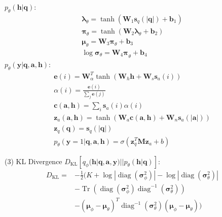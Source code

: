 \documentclass{article}
\newcommand{\nobracket}{}
\newcommand{\tmmathbf}[1]{\ensuremath{\boldsymbol{#1}}}
\newcommand{\tmop}[1]{\ensuremath{\operatorname{#1}}}
\begin{document}
\begin{appendices}
$p_{\theta} ( \tmmathbf{h} | \tmmathbf{q} \nobracket)$:
\begin{eqnarray}
  & \tmmathbf{\lambda}_{\theta} = \tanh ( \tmmathbf{W}_1 \tmmathbf{s}_q ( |
  \tmmathbf{q} |) +\tmmathbf{b}_1)  &   \\
  & \tmmathbf{\pi}_{\theta} = \tanh ( \tmmathbf{W}_2
  \tmmathbf{\lambda}_{\theta} +\tmmathbf{b}_2) &   \\
  & \tmmathbf{\mu}_{\theta} =\tmmathbf{W}_3 \tmmathbf{\pi}_{\theta}
  +\tmmathbf{b}_3  &   \\
  & \log \tmmathbf{\sigma}_{\theta} =\tmmathbf{W}_4
  \tmmathbf{\pi_{}}_{\theta} +\tmmathbf{b}_4  &   
\end{eqnarray}
$p_{\theta} ( \tmmathbf{y} | \tmmathbf{q}, \tmmathbf{a}, \tmmathbf{h}
\nobracket)$:
\begin{eqnarray}
  & \tmmathbf{e} ( i) =\tmmathbf{W}_{\alpha}^T \tanh ( \tmmathbf{W}_h
  \tmmathbf{h}+\tmmathbf{W}_s \tmmathbf{s}_a ( i)) &   \\
  & \alpha ( i) = \frac{\tmmathbf{e} ( i)}{\sum_j \tmmathbf{e} ( j)} & 
   \\
  & \tmmathbf{c} ( \tmmathbf{a}, \tmmathbf{h}) = \sum_i \tmmathbf{s}_a ( i)
  \alpha ( i) &   \\
  & \tmmathbf{z}_a ( \tmmathbf{a}, \tmmathbf{h}) = \tanh ( \tmmathbf{W}_a
  \tmmathbf{c} ( \tmmathbf{a}, \tmmathbf{h}) +\tmmathbf{W}_n \tmmathbf{s}_a (
  | \tmmathbf{a} |)) &   \\
  & \tmmathbf{z}_q ( \tmmathbf{q}) =\tmmathbf{s}_q ( | \tmmathbf{q} |) & 
   \\
  & p_{\theta} ( \tmmathbf{y}= 1 | \tmmathbf{q}, \tmmathbf{a}, \tmmathbf{h}
  \nobracket) = \sigma ( \tmmathbf{z}_q^T \tmmathbf{M}\tmmathbf{z}_a + b) & 
\end{eqnarray}

(3) KL Divergence $D_{\tmop{KL}} [ q_{\phi} ( \tmmathbf{h} | \tmmathbf{q},
\tmmathbf{a}, \tmmathbf{y} \nobracket) | | p_{\theta} ( \tmmathbf{h} |
\tmmathbf{q} \nobracket)]$:
\begin{align}
  \nonumber D_{\tmop{KL}}  = & - \frac{1}{2}  (K + \log | \tmop{diag} (
  \tmmathbf{\sigma}_{\phi}^2) | - \log | \tmop{diag} (
  \tmmathbf{\sigma}_{\theta}^2) | \\
  \nonumber & -  \tmop{Tr} ( \tmop{diag} (
  \tmmathbf{\sigma}^2_{\phi}) \tmop{diag}^{-1} (
  \tmmathbf{\sigma}^2_{\theta}))  \\ 
  & - ( \tmmathbf{\mu}_{\phi} -
  \tmmathbf{\mu}_{\theta})^T \tmop{diag}^{-1} (
  \tmmathbf{\sigma}^2_{\theta}) ( \tmmathbf{\mu}_{\phi} -
  \tmmathbf{\mu}_{\theta}))
\end{align}


\end{appendices}
\end{document}
